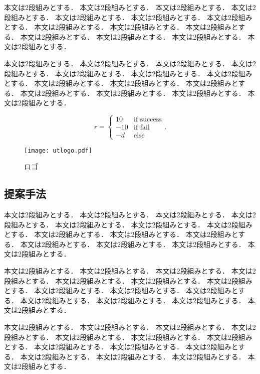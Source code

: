 \documentclass{/workdir/classes/summary}
\begin{document}
本文は2段組みとする．
本文は2段組みとする．
本文は2段組みとする．
本文は2段組みとする．
本文は2段組みとする．
本文は2段組みとする．
本文は2段組みとする．
本文は2段組みとする．
本文は2段組みとする．
本文は2段組みとする．
本文は2段組みとする．
本文は2段組みとする．
本文は2段組みとする．
本文は2段組みとする．

本文は2段組みとする．
本文は2段組みとする．
本文は2段組みとする．
本文は2段組みとする．
本文は2段組みとする．
本文は2段組みとする．
本文は2段組みとする．
本文は2段組みとする．
本文は2段組みとする．
本文は2段組みとする．
本文は2段組みとする．
本文は2段組みとする．
本文は2段組みとする．
本文は2段組みとする．

\begin{equation}
  r = \left\{
    \begin{array}{cc}
      10   & \text{if success} \\
      - 10 & \text{if fail}    \\
      - d  & \text{else}
    \end{array}
  \right. \text{.}
\end{equation}

\begin{figure}[tb]
  \centering
  \texttt{[image: utlogo.pdf]}
  \caption{ロゴ}
  \label{fig:logo}
\end{figure}

\subsection{提案手法}
本文は2段組みとする．
本文は2段組みとする．
本文は2段組みとする．
本文は2段組みとする．
本文は2段組みとする．
本文は2段組みとする．
本文は2段組みとする．
本文は2段組みとする．
本文は2段組みとする．
本文は2段組みとする．
本文は2段組みとする．
本文は2段組みとする．
本文は2段組みとする．
本文は2段組みとする．

本文は2段組みとする．
本文は2段組みとする．
本文は2段組みとする．
本文は2段組みとする．
本文は2段組みとする．
本文は2段組みとする．
本文は2段組みとする．
本文は2段組みとする．
本文は2段組みとする．
本文は2段組みとする．
本文は2段組みとする．
本文は2段組みとする．
本文は2段組みとする．
本文は2段組みとする．

本文は2段組みとする．
本文は2段組みとする．
本文は2段組みとする．
本文は2段組みとする．
本文は2段組みとする．
本文は2段組みとする．
本文は2段組みとする．
本文は2段組みとする．
本文は2段組みとする．
本文は2段組みとする．
本文は2段組みとする．
本文は2段組みとする．
本文は2段組みとする．
本文は2段組みとする．
\end{document}
